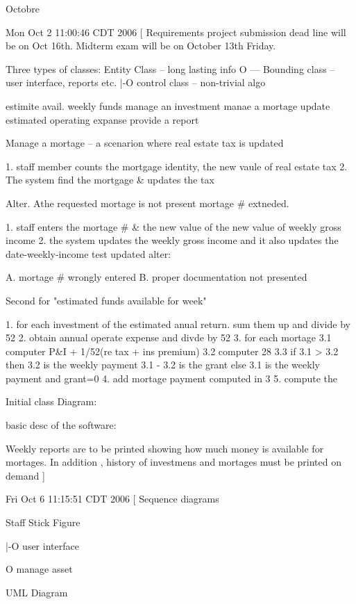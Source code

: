 \documentclass[a4paper]{article}
\begin{document}
Octobre
{

Mon Oct  2 11:00:46 CDT 2006
[
  Requirements project submission dead line will be on Oct 16th.
  Midterm exam will be on October 13th Friday.

  Three types of classes:
  	Entity Class   -- long lasting info       O
											 ---
	Bounding class	-- user interface, reports etc.   |-O
	control class	-- non-trivial algo


	estimite avail. weekly funds
	manage an investment
	manae a mortage
	update estimated operating expanse
	provide a report

    
	Manage a mortage -- a scenarion where real estate tax is updated


	1. staff member
		counts the mortgage identity,
		the new vaule of real estate tax
	2. The system find the mortgage & updates the tax

	Alter.
		Athe requested mortage is not present mortage # extneded.

	1.  staff enters the mortage # & the new value of the new value of weekly gross income
	2.  the system updates the weekly gross income and it also updates the date-weekly-income test updated
	alter:

	A.  mortage # wrongly entered
	B. proper documentation not presented

  Second for "estimated funds available for week" 

  1.  for each investment of the estimated anual return.
     sum them up and divide by 52
  2.  obtain annual operate expense and divde by 52
  3.  for each mortage
      3.1 computer P&I + 1/52(re tax + ins premium)
	  3.2 computer 28%
	  3.3 if 3.1 > 3.2 then
	        3.2 is the weekly payment
			3.1 - 3.2 is the grant
		  else 
		     3.1 is the weekly payment and grant=0 
  4.  add mortage  payment computed in 3
  5.  compute the \cdots 


  Initial class Diagram:

    basic desc of the software:

		 Weekly reports are to be printed showing how much money is available for mortages.  In addition , history of investmens and mortages must be printed on demand
]

Fri Oct  6 11:15:51 CDT 2006
[
  Sequence diagrams

  Staff
   Stick Figure

  |-O
    user interface

	O  manage asset

 UML Diagram


}
\end{document}
